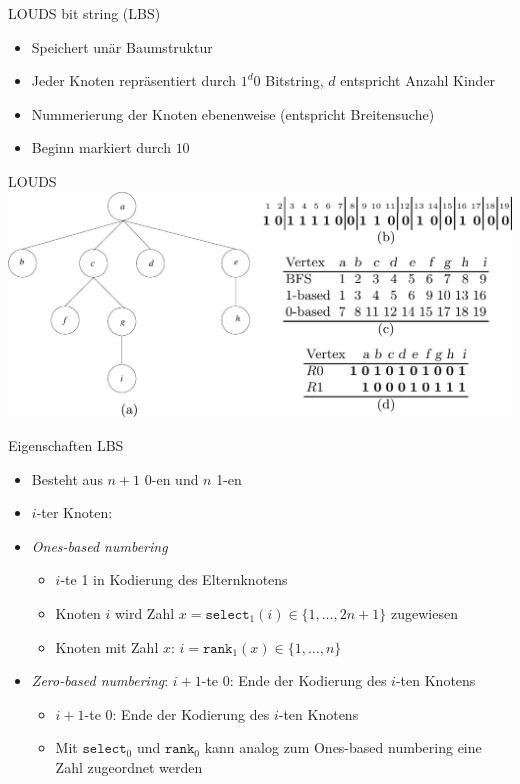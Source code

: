 \documentclass[ngerman,aspectratio=169,10pt]{beamer}
\begin{document}
\begin{frame}{LOUDS bit string (LBS)}
    \begin{itemize}
        \item Speichert unär Baumstruktur
        \item Jeder Knoten repräsentiert durch $1^d0$ Bitstring, $d$ entspricht Anzahl Kinder
        \item Nummerierung der Knoten ebenenweise (entspricht Breitensuche)
        \item Beginn markiert durch $10$
    \end{itemize}
\end{frame}

\begin{frame}{LOUDS}
    \includegraphics[width=1.0\textwidth]{LOUDS.jpg}
\end{frame}

\begin{frame}{Eigenschaften LBS}
    \begin{itemize}
        \item Besteht aus $n+1$ 0-en und $n$ 1-en
        \item $i$-ter Knoten:
        \item \textit{Ones-based numbering}
        \begin{itemize}
            \item $i$-te 1 in Kodierung des Elternknotens
            \item Knoten $i$ wird Zahl $x=\texttt{select}_1(i)\in\{1,\ldots,2n+1\}$ zugewiesen
            \item Knoten mit Zahl $x$: $i=\texttt{rank}_1(x)\in\{1,\ldots,n\}$
        \end{itemize}
        \item \textit{Zero-based numbering}: $i+1$-te 0: Ende der Kodierung des $i$-ten Knotens
        \begin{itemize}
            \item $i+1$-te 0: Ende der Kodierung des $i$-ten Knotens
            \item Mit $\texttt{select}_0$ und $\texttt{rank}_0$ kann analog zum Ones-based numbering eine Zahl zugeordnet werden
        \end{itemize}
    \end{itemize}
\end{frame}
\end{document}
